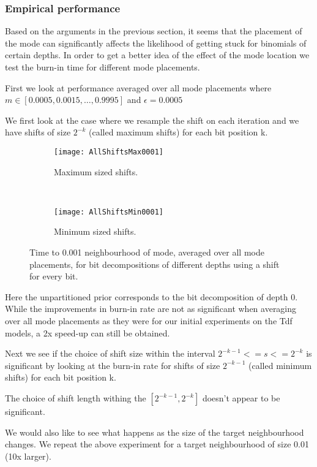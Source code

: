 \subsubsection{Empirical performance}

Based on the arguments in the previous section, it seems that the placement of the mode can significantly affects the likelihood of getting stuck for binomials of certain depths. In order to get a better idea of the effect of the mode location we test the burn-in time for different mode placements. 

First we look at performance averaged over all mode placements where $m \in [0.0005, 0.0015,…, 0.9995]$ and $\epsilon = 0.0005$

We first look at the case where we resample the shift on each iteration and we have shifts of size $2^{-k}$ (called maximum shifts) for each bit position k.

\begin{figure}[h]
    \centering
    \begin{subfigure}[t]{0.48\textwidth}
      \texttt{[image: AllShiftsMax0001]}
      \caption{Maximum sized shifts.}
    \end{subfigure}
    ~
    \begin{subfigure}[t]{0.48\textwidth}
      \texttt{[image: AllShiftsMin0001]}
      \caption{Minimum sized shifts.}
    \end{subfigure}
    \caption{Time to 0.001 neighbourhood of mode, averaged over all mode placements, for bit decompositions of different depths using a shift for every bit.}
    \label{fig:allShifts}
\end{figure}


Here the unpartitioned prior corresponds to the bit decomposition of depth 0. While the improvements in burn-in rate are not as significant when averaging over all mode placements as they were for our initial experiments on the Tdf models, a 2x speed-up can still be obtained.

Next we see if the choice of shift size within the interval $2^{-k-1} <= s <= 2^{-k}$ is significant by looking at the burn-in rate for shifts of size $2^{-k-1}$ (called minimum shifts) for each bit position k.

The choice of shift length withing the $[2^{-k-1}, 2^{-k}]$ doesn't appear to be significant.

We would also like to see what happens as the size of the target neighbourhood changes. We repeat the above experiment for a target neighbourhood of size 0.01 (10x larger).

